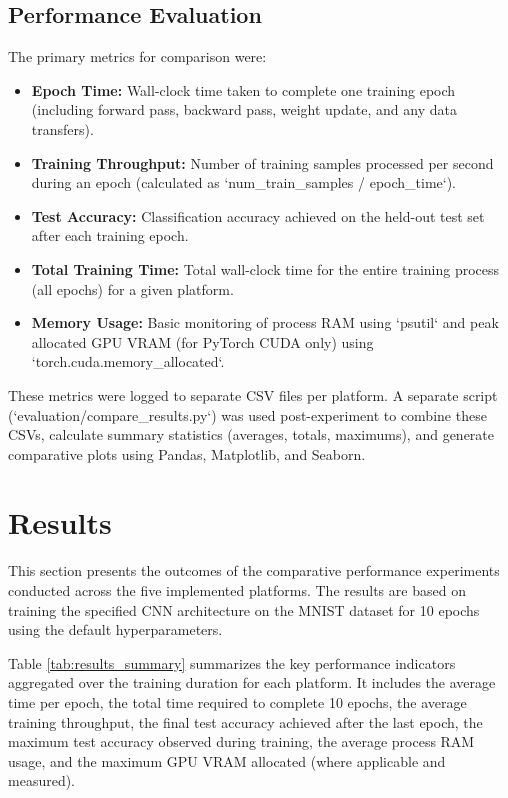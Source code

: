 \documentclass[conference]{IEEEtran} %
\begin{document}
\subsection{Performance Evaluation}
The primary metrics for comparison were:
\begin{itemize}
    \item \textbf{Epoch Time:} Wall-clock time taken to complete one training epoch (including forward pass, backward pass, weight update, and any data transfers).
    \item \textbf{Training Throughput:} Number of training samples processed per second during an epoch (calculated as `num_train_samples / epoch_time`).
    \item \textbf{Test Accuracy:} Classification accuracy achieved on the held-out test set after each training epoch.
    \item \textbf{Total Training Time:} Total wall-clock time for the entire training process (all epochs) for a given platform.
    \item \textbf{Memory Usage:} Basic monitoring of process RAM using `psutil` and peak allocated GPU VRAM (for PyTorch CUDA only) using `torch.cuda.memory_allocated`.
\end{itemize}
These metrics were logged to separate CSV files per platform. A separate script (`evaluation/compare_results.py`) was used post-experiment to combine these CSVs, calculate summary statistics (averages, totals, maximums), and generate comparative plots using Pandas, Matplotlib, and Seaborn.

\section{Results}
\label{sec:results}
This section presents the outcomes of the comparative performance experiments conducted across the five implemented platforms. The results are based on training the specified CNN architecture on the MNIST dataset for 10 epochs using the default hyperparameters.

Table \ref{tab:results_summary} summarizes the key performance indicators aggregated over the training duration for each platform. It includes the average time per epoch, the total time required to complete 10 epochs, the average training throughput, the final test accuracy achieved after the last epoch, the maximum test accuracy observed during training, the average process RAM usage, and the maximum GPU VRAM allocated (where applicable and measured).
\end{document}
